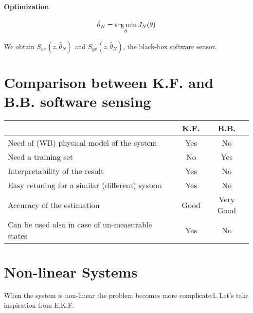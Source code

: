 \paragraph{Optimization}
\[
    \hat{\theta}_N = \operatorname*{arg\,min}_\theta J_N(\theta)
\]

We obtain $S_{ux}(z, \hat{\theta}_N)$ and $S_{yx}(z, \hat{\theta}_N)$, the black-box software sensor.

\section{Comparison between K.F. and B.B. software sensing}

\begin{table}
    \centering
    \begin{tabular}{l|c|c}
        & \textbf{K.F.} & \textbf{B.B.} \\
        \hline
        Need of (WB) physical model of the system & \color{red} Yes & \color{green} No \\
        Need a training set & \color{green} No & \color{red} Yes \\
        Interpretability of the result & \color{green} Yes & \color{red} No \\
        Easy retuning for a similar (different) system & \color{green} Yes & \color{red} No \\
        Accuracy of the estimation & \color{green} Good & \color{green} Very Good \\
        Can be used also in case of un-measurable states & \color{green} Yes & \color{red} No \\
    \end{tabular}
\end{table}

\section{Non-linear Systems}

When the system is non-linear the problem becomes more complicated.
Let's take inspiration from E.K.F.

